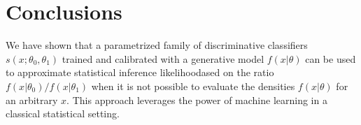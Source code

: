 \documentclass[11pt, oneside]{article}   	%
\begin{document}


\section{Conclusions}

We have shown that a parametrized family of discriminative classifiers $s(x; \theta_0, \theta_1)$ trained and calibrated with a generative model $f(x|\theta)$ can be used to approximate statistical inference likelihoodased on the  ratio $f(x|\theta_0)/f(x|\theta_1)$ when it is not possible to evaluate the densities $f(x|\theta)$ for an arbitrary $x$. This approach leverages the power of machine learning in a classical statistical setting.
\end{document}

